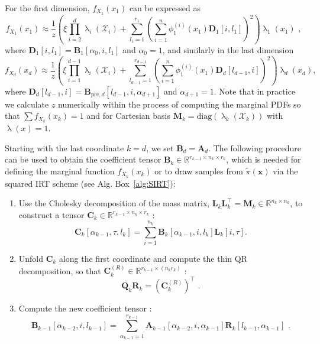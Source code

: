 For the first dimension, $f_{X_1}(x_1)$ can be expressed as \cite[Eq.~30]{cui2022deep}
\begin{equation}
	f_{X_1}(x_1)  \approx \frac{1}{z} \left(\xi \prod_{i=2}^{d} \uplambda_i(\mathcal{X}_i) + \sum_{l_1=1}^{r_1} \left(\sum_{i=1}^{n} \phi^{(i)}_1(x_1) \bm{D}_1[i, l_1] \right)^2 \right) \uplambda_1(x_1)\, \, ,
	\label{eq:firstMarg}
\end{equation}
where $\bm{D}_1[i, l_1] = \bm{B}_1[\alpha_0, i, l_1]$ and $\alpha_0 = 1$,
and similarly in the last dimension
\begin{equation}
	f_{X_d}(x_d)  \approx \frac{1}{z} \left(\xi \prod_{i=1}^{d-1} \uplambda_i(\mathcal{X}_i) + \sum_{l_{d-1}=1}^{r_{d-1}} \left(\sum_{i=1}^{n} \phi^{(i)}_1(x_1) \bm{D}_d[l_{d-1},i] \right)^2 \right) \uplambda_d(x_d),
\end{equation}
where $\bm{D}_d[l_{d-1},i] = \bm{B}_{\text{pre},d}[l_{d-1}, i, \alpha_{d+1}]$ and $\alpha_{d+1} = 1$.
Note that in practice we calculate $z$ numerically within the process of computing the marginal PDFs so that $\sum f_{X_k}(x_k) =1 $ and for Cartesian basis $\bm{M}_k = \text{diag}(\uplambda_k(\mathcal{X}_k))$ with $\uplambda(x) = 1$.
\clearpage
\begin{prop}
	\label{prob:backMarg}
	Starting with the last coordinate $k = d$, we set $\bm{B}_d = \bm{A}_d$. The following procedure can be used to obtain the coefficient tensor $\bm{B}_{k} \in \mathbb{R}^{r_{k-1} \times n_{k} \times r_{k}}$, which is needed for defining the marginal function $f_{X_k}(x_k)$ or to draw samples from $\tilde{\pi}(\bm{x})$ via the squared IRT scheme (see Alg. Box~\ref{alg:SIRT}):
	\begin{enumerate}
		\item Use the Cholesky decomposition of the mass matrix, $\bm{L}_k \bm{L}_k^\top = \bm{M}_k \in \mathbb{R}^{n_k \times n_k}$, to construct a tensor $\bm{C}_k \in \mathbb{R}^{r_{k-1} \times n_k \times r_k}$ \cite[Eq.~27]{cui2022deep}:
		\begin{equation}
			\bm{C}_k[\alpha_{k-1}, \tau, l_k] = \sum_{i=1}^{n_k} \bm{B}_k[\alpha_{k-1}, i, l_k] \bm{L}_k[i, \tau]  \label{eq:constrCBack}.
		\end{equation}
		\item Unfold $\bm{C}_k$ along the first coordinate and compute the thin QR decomposition, so that $\bm{C}_k^{(R)} \in \mathbb{R}^{r_{k-1} \times (n_k r_k)}$  \cite[Eq.~28]{cui2022deep}:
		\begin{equation}
			\bm{Q}_k \bm{R}_k = {(\bm{C}_k^{(R)})}^{\top} \, \, .\label{eq:thinQRBack}
		\end{equation}
		\item Compute the new coefficient tensor \cite[Eq.~29]{cui2022deep}:
		\begin{equation}
			\bm{B}_{k-1}[\alpha_{k-2}, i, l_{k-1}] = \sum_{\alpha_{k-1}=1}^{r_{k-1}} \bm{A}_{k-1}[\alpha_{k-2}, i, \alpha_{k-1}] \bm{R}_k[l_{k-1}, \alpha_{k-1}]\, \,   \label{eq:nextCoeffTBack}.
		\end{equation}
	\end{enumerate}
\end{prop}

